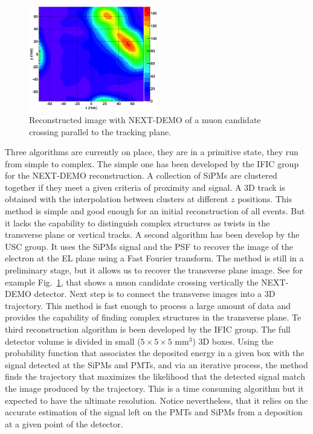 \begin{figure}
\begin{center}
\includegraphics[width=0.5\textwidth]{img/CALREC_slice5muon.png}
\caption{\small Reconstructed image with NEXT-DEMO of a muon candidate crossing parallel to the tracking plane.}
\label{fig:CALREC_muon}
\end{center}
\end{figure}

Three algorithms are currently on place, they are in a primitive state, they run from simple to complex.
The simple one has been developed by the IFIC group for the NEXT-DEMO reconstruction. A collection of SiPMs are clustered together if they meet a given criteria of proximity and signal. A 3D track is obtained with the interpolation between clusters at different $z$ positions. This method is simple and good enough for an initial reconstruction of all events. But it lacks the capability to distinguish complex structures as twists in the transverse plane or vertical tracks. 
A second algorithm has been develop by the USC group. It uses the SiPMs signal and the PSF to recover the image of the electron at the EL plane using a Fast Fourier transform. The method is still in a preliminary stage, but it allows us to recover the transverse plane image. See for example Fig.~\ref{fig:CALREC_muon}, that shows a muon candidate crossing vertically the NEXT-DEMO detector. Next step is to connect the transverse images into a 3D trajectory. This method is fast enough to process a large amount of data and provides the capability of finding complex structures in the transverse plane. 
Te third reconstruction algorithm is been developed by the IFIC group. The full detector volume is divided in small ($5\times5\times5$ mm$^3$) 3D boxes. Using the probability function that associates the deposited energy in a given box with the signal detected at the SiPMs and PMTs, and via an iterative process, the method finds the trajectory that maximizes the likelihood that the detected signal match the image produced by the trajectory. This is a time consuming algorithm but it expected to have the ultimate resolution. Notice nevertheless, that it relies on the accurate estimation of the signal left on the PMTs and SiPMs from a deposition at a given point of the detector. 

